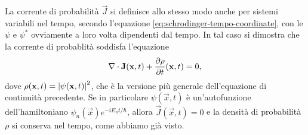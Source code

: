 La corrente di probabilità $\vec J$ si definisce allo stesso modo anche per sistemi variabili nel tempo, secondo l'equazione \eqref{eq:schrodinger-tempo-coordinate}, con le $\psi$ e $\psi^*$ ovviamente a loro volta dipendenti dal tempo.
In tal caso si dimostra che la corrente di probablità soddisfa l'equazione
\begin{equation}
	\nabla\cdot\mathbf{J}(\mathbf{x},t)+\frac{\partial {\rho}}{\partial {t}}(\mathbf{x},t)=0,
	\label{eq:continuita-corrente-probabilita}
\end{equation}
dove $\rho(\mathbf{x},t)=\left|{\psi(\mathbf{x},t)}\right|^2$, che è la versione più generale dell'equazione di continuità precedente.
Se in particolare $\psi(\vec x,t)$ è un'autofunzione dell'hamiltoniano $\psi_n(\vec x)e^{-iE_nt/\hbar}$, allora $\vec J(\vec x,t)=0$ e la densità di probabilità $\rho$ si conserva nel tempo, come abbiamo già visto.

